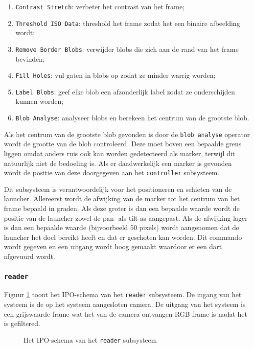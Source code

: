 \begin{enumerate}
    \item \texttt{Contrast Stretch}: verbeter het contrast van het frame;
    \item \texttt{Threshold ISO Data}: threshold het frame zodat het een binaire
        afbeelding wordt;
    \item \texttt{Remove Border Blobs}: verwijder blobs die zich aan de rand
        van het frame bevinden;
    \item \texttt{Fill Holes}: vul gaten in blobs op zodat ze minder warrig
        worden;
    \item \texttt{Label Blobs}: geef elke blob een afzonderlijk label zodat ze
        onderschijden kunnen worden;
    \item \texttt{Blob Analyse}: analyseer blobs en berekeen het centrum van
        de grootste blob.
\end{enumerate}

Als het centrum van de grootste blob gevonden is door de \texttt{blob analyse}
operator wordt de grootte van de blob controleerd. Deze moet boven een bepaalde
grens liggen omdat anders ruis ook kan worden gedetecteerd als marker, terwijl
dit natuurlijk niet de bedoeling is. Als er daadwerkelijk een marker is gevonden
wordt de positie van deze doorgegeven aan het \texttt{controller} subsysteem.

Dit subsysteem is verantwoordelijk voor het positioneren en schieten van de
\autonerf launcher. Allereerst wordt de afwijking van de marker tot het centrum
van het frame bepaald in graden. Als deze groter is dan een bepaalde waarde
wordt de positie van de launcher zowel de pan- als tilt-as aangepast. Als de
afwijking lager is dan een bepaalde waarde (bijvoorbeeld 50 pixels) wordt
aangenomen dat de launcher het doel bereikt heeft en dat er geschoten kan
worden. Dit commando wordt gegeven en een uitgang wordt hoog gemaakt waardoor
er een dart afgevuurd wordt.

\subsubsection{\texttt{reader}}

Figuur \ref{fig:ipo-reader} toont het IPO-schema van het \texttt{reader}
subsysteem. De ingang van het systeem is de op het systeem aangesloten camera.
De uitgang van het systeem is een grijswaarde frame wat het van de camera
ontvangen RGB-frame is nadat het is gefiltered.

\begin{figure}[H]
    \begin{center}
        
    \end{center}
    \caption{Het IPO-schema van het \texttt{reader} subsysteem}
    \label{fig:ipo-reader}
\end{figure}

